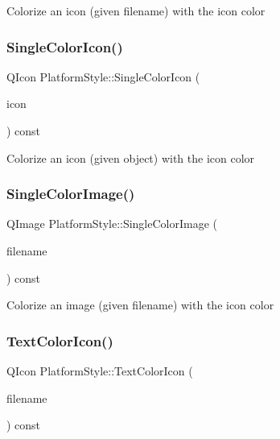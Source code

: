 Colorize an icon (given filename) with the icon color \mbox{\label{class_platform_style_af2ff6ee24cd5745b34a945afecdf41f7}} 
\subsubsection{\texorpdfstring{SingleColorIcon()}{SingleColorIcon()}\hspace{0.1cm}{\footnotesize\ttfamily [2/2]}}
{\footnotesize\ttfamily Q\+Icon Platform\+Style\+::\+Single\+Color\+Icon (\begin{DoxyParamCaption}\item[{const Q\+Icon \&}]{icon }\end{DoxyParamCaption}) const}

Colorize an icon (given object) with the icon color \mbox{\label{class_platform_style_adecebc4670880700203340d322351f89}} 
\subsubsection{\texorpdfstring{SingleColorImage()}{SingleColorImage()}}
{\footnotesize\ttfamily Q\+Image Platform\+Style\+::\+Single\+Color\+Image (\begin{DoxyParamCaption}\item[{const Q\+String \&}]{filename }\end{DoxyParamCaption}) const}

Colorize an image (given filename) with the icon color \mbox{\label{class_platform_style_ac3c91893b60a84a98155b7b9603918bd}} 
\subsubsection{\texorpdfstring{TextColorIcon()}{TextColorIcon()}\hspace{0.1cm}{\footnotesize\ttfamily [1/2]}}
{\footnotesize\ttfamily Q\+Icon Platform\+Style\+::\+Text\+Color\+Icon (\begin{DoxyParamCaption}\item[{const Q\+String \&}]{filename }\end{DoxyParamCaption}) const}

